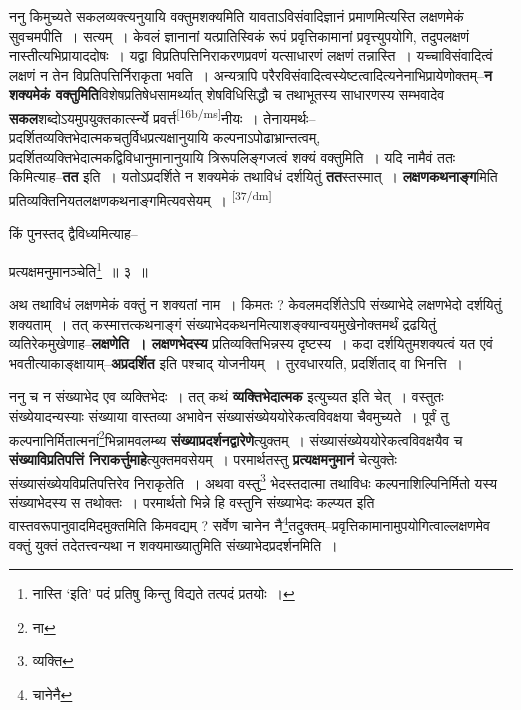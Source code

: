 \documentclass[article,12pt,a4paper]{memoir}
\begin{document}
	  \pstart ननु किमुच्यते सकलव्यक्त्यनुयायि वक्तुमशक्यमिति यावताऽविसंवादिज्ञानं प्रमाणमित्यस्ति लक्षणमेकं सुवचमपीति । सत्यम् । केवलं ज्ञानानां यत्प्रातिस्विकं रूपं प्रवृत्तिकामानां प्रवृत्त्युपयोगि, तदुपलक्षणं नास्तीत्यभिप्रायाददोषः । यद्वा विप्रतिपत्तिनिराकरणप्रवणं यत्साधारणं लक्षणं तन्नास्ति । यच्चाविसंवादित्वं लक्षणं न तेन विप्रतिपत्तिर्निराकृता भवति । अन्यत्रापि परैरविसंवादित्वस्येष्टत्वादित्यनेनाभिप्रायेणोक्तम्--\textbf{न शक्यमेकं वक्तुमिति}विशेषप्रतिषेधसामर्थ्यात् शेषविधिसिद्धौ च तथाभूतस्य साधारणस्य सम्भवादेव \textbf{सकल}शब्दोऽयमुपयुक्तकार्त्स्न्ये प्रवर्त्त\leavevmode\textsuperscript{\rmlatinfont\tiny [16b/ms]}नीयः । तेनायमर्थः--प्रदर्शितव्यक्तिभेदात्मकचतुर्विधप्रत्यक्षानुयायि कल्पनाऽपोढाभ्रान्तत्वम्, प्रदर्शितव्यक्तिभेदात्मकद्विविधानुमानानुयायि त्रिरूपलिङ्गजत्वं शक्यं वक्तुमिति । यदि नामैवं ततः किमित्याह--\textbf{तत} इति । यतोऽप्रदर्शिते न शक्यमेकं तथाविधं दर्शयितुं \textbf{तत}स्तस्मात् । \textbf{लक्षणकथनाङ्ग}मिति प्रतिव्यक्तिनियतलक्षणकथनाङ्गमित्यवसेयम् ।
	\pend
      \leavevmode\textsuperscript{\rmlatinfont\tiny [37/dm]}

	  \pstart किं पुनस्तद् द्वैविध्यमित्याह--
	\pend
       

	  \pstart प्रत्यक्षमनुमानञ्चेति\footnote{नास्ति ‘इति’ पदं \cite{dp-msB} \cite{dp-edP} \cite{dp-edH} \cite{dp-edE} \cite{dp-edN} प्रतिषु किन्तु विद्यते तत्पदं \cite{dp-msC} \cite{dp-msD} प्रतयोः ।} ॥ ३ ॥
	\pend
      

	  \pstart अथ तथाविधं लक्षणमेकं वक्तुं न शक्यतां नाम । किमतः ? केवलमदर्शितेऽपि संख्याभेदे लक्षणभेदो दर्शयितुं शक्यताम् । तत् कस्मात्तत्कथनाङ्गं संख्याभेदकथनमित्याशङ्क्यान्वयमुखेनोक्तमर्थं द्रढयितुं व्यतिरेकमुखेणाह--\textbf{लक्षणेति । लक्षणभेदस्य} प्रतिव्यक्तिभिन्नस्य दृष्टस्य । कदा दर्शयितुमशक्यत्वं यत एवं भवतीत्याकाङ्क्षायाम्--\textbf{अप्रदर्शित} इति पश्चाद् योजनीयम् । तुरवधारयति, प्रदर्शिताद् वा भिनत्ति ।
	\pend
      

	  \pstart ननु च न संख्याभेद एव व्यक्तिभेदः । तत् कथं \textbf{व्यक्तिभेदात्मक} इत्युच्यत इति चेत् । वस्तुतः संख्येयादन्यस्याः संख्याया वास्तव्या अभावेन संख्यासंख्येययोरेकत्वविवक्षया चैवमुच्यते । पूर्वं तु कल्पनानिर्मितात्मनां\footnote{ना}भिन्नामवलम्ब्य \textbf{संख्याप्रदर्शनद्वारेणे}त्युक्तम् । संख्यासंख्येययोरेकत्वविवक्षयैव च \textbf{संख्याविप्रतिपत्तिं निराकर्त्तुमाहे}त्युक्तमवसेयम् । परमार्थतस्तु \textbf{प्रत्यक्षमनुमानं} चेत्युक्तेः संख्यासंख्येयविप्रतिपत्तिरेव निराकृतेति । अथवा वस्तु\footnote{व्यक्ति} भेदस्तदात्मा तथाविधः कल्पनाशिल्पिनिर्मितो यस्य संख्याभेदस्य स तथोक्तः । परमार्थतो भिन्ने हि वस्तुनि संख्याभेदः कल्प्यत इति वास्तवरूपानुवादमिदमुक्तमिति किमवद्यम् ? सर्वेण चानेन नै\footnote{चानेनै}तदुक्तम्--प्रवृत्तिकामानामुपयोगित्वाल्लक्षणमेव वक्तुं युक्तं तदेतत्त्वन्यथा न शक्यमाख्यातुमिति संख्याभेदप्रदर्शनमिति ।
	\pend
      
\end{document}
